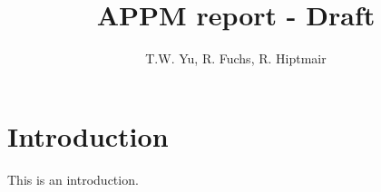 \documentclass{report}
\title{APPM report - Draft}
\author{T.W. Yu, R. Fuchs, R. Hiptmair}
\begin{document}
\maketitle

\chapter{Introduction}

This is an introduction.
\end{document}
